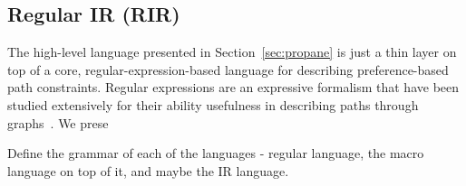 \subsection{Regular IR (RIR)} 
\label{sec:rir}

The high-level language presented in Section~\ref{sec:propane} is just a thin layer on top of a core, regular-expression-based language for describing preference-based path constraints. Regular expressions are an expressive formalism that have been studied extensively for their ability usefulness in describing paths through graphs~\cite{bib:todo}. We prese

Define the grammar of each of the languages - regular language, the macro language on top of it, and maybe the IR language.

\newcommand{\BNFALT}{\;\;|\;\;}
\newcommand{\hdr}[2]{\flushleft \chdr{#1}{#2}}
\newcommand{\chdr}[2]{\textbf{#1} {#2} \\ \centering}


